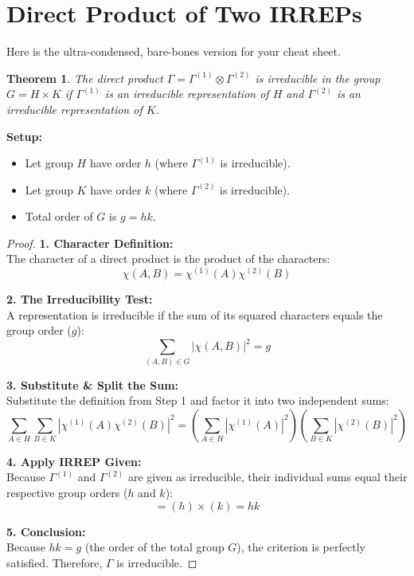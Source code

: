\documentclass[11pt, a4paper]{report}
\newtheorem{theorem}{Theorem}
\begin{document}
\section{Direct Product of Two IRREPs}

Here is the ultra-condensed, bare-bones version for your cheat sheet.

\begin{theorem}
The direct product $\Gamma = \Gamma^{(1)} \otimes \Gamma^{(2)}$ is irreducible in the group $G = H \times K$ if $\Gamma^{(1)}$ is an irreducible representation of $H$ and $\Gamma^{(2)}$ is an irreducible representation of $K$.
\end{theorem}

\textbf{Setup:}
\begin{itemize}
    \item Let group $H$ have order $h$ (where $\Gamma^{(1)}$ is irreducible).
    \item Let group $K$ have order $k$ (where $\Gamma^{(2)}$ is irreducible).
    \item Total order of $G$ is $g = hk$.
\end{itemize}

\begin{proof}
\textbf{1. Character Definition:} \\
The character of a direct product is the product of the characters:
\[ \chi(A, B) = \chi^{(1)}(A) \chi^{(2)}(B) \]

\textbf{2. The Irreducibility Test:} \\
A representation is irreducible if the sum of its squared characters equals the group order ($g$):
\[ \sum_{(A,B) \in G} |\chi(A, B)|^2 = g \]

\textbf{3. Substitute \& Split the Sum:} \\
Substitute the definition from Step 1 and factor it into two independent sums:
\[ \sum_{A \in H} \sum_{B \in K} \left| \chi^{(1)}(A) \chi^{(2)}(B) \right|^2 = \left( \sum_{A \in H} |\chi^{(1)}(A)|^2 \right) \left( \sum_{B \in K} |\chi^{(2)}(B)|^2 \right) \]

\textbf{4. Apply IRREP Given:} \\
Because $\Gamma^{(1)}$ and $\Gamma^{(2)}$ are given as irreducible, their individual sums equal their respective group orders ($h$ and $k$):
\[ = (h) \times (k) = hk \]

\textbf{5. Conclusion:} \\
Because $hk = g$ (the order of the total group $G$), the criterion is perfectly satisfied. Therefore, $\Gamma$ is irreducible.
\end{proof}
\end{document}
